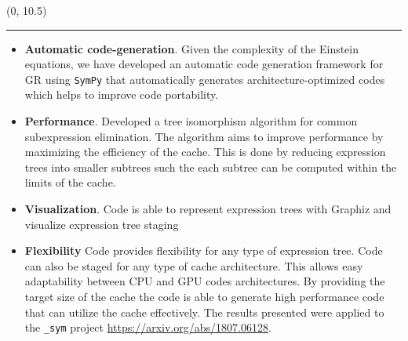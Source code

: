 \documentclass[landscape]{a0poster}
\def\Subhead#1{\noindent{\textbf{\Large\color{DarkBlue} #1}}\medskip}
\begin{document}
	\begin{textblock}{14}(0, 10.5)
		{\color{DarkBlue}\hrule}\medskip
		\Subhead{Contributions}
		\vspace{-0.2in}
		\begin{itemize}
			\item \textbf{Automatic code-generation}. Given the complexity of the Einstein equations, we have developed an automatic code generation framework for GR using \texttt{SymPy} that automatically generates architecture-optimized codes which helps to improve code portability. 
			\item \textbf{Performance}. Developed a tree isomorphism algorithm for common subexpression elimination. The algorithm aims to improve performance by maximizing the efficiency of the cache. This is done by reducing expression trees into smaller subtrees such the each subtree can be computed within the limits of the cache.
			\item \textbf{Visualization}. 
			Code is able to represent expression trees with Graphiz and visualize expression tree staging	
			\item \textbf{Flexibility}
			Code provides flexibility for any type of expression tree. Code can also be staged for any type of cache architecture. This allows easy adaptability between CPU and GPU codes architectures.
			By providing the target size of the cache the code is able to generate high performance code that can utilize the cache effectively. The results presented were applied to the \texttt{{\dendro\_sym}} project \url{https://arxiv.org/abs/1807.06128}.
			
		
		\end{itemize}
		
	\end{textblock}
	
\end{document}
